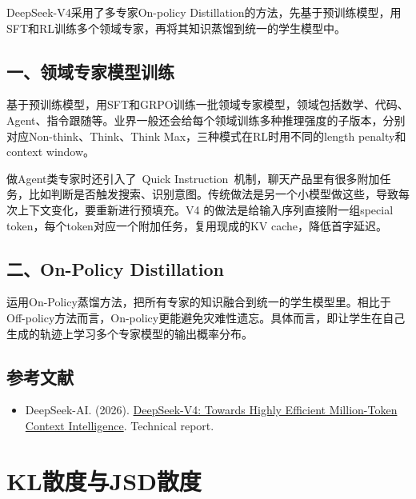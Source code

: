 DeepSeek-V4采用了多专家On-policy Distillation的方法，先基于预训练模型，用SFT和RL训练多个领域专家，再将其知识蒸馏到统一的学生模型中。

\hypertarget{ux4e00ux9886ux57dfux4e13ux5bb6ux6a21ux578bux8badux7ec3}{%
\subsection{一、领域专家模型训练}\label{ux4e00ux9886ux57dfux4e13ux5bb6ux6a21ux578bux8badux7ec3}}

基于预训练模型，用SFT和GRPO训练一批领域专家模型，领域包括数学、代码、Agent、指令跟随等。业界一般还会给每个领域训练多种推理强度的子版本，分别对应Non-think、Think、Think Max，三种模式在RL时用不同的length penalty和context window。

做Agent类专家时还引入了~Quick Instruction~机制，聊天产品里有很多附加任务，比如判断是否触发搜索、识别意图。传统做法是另一个小模型做这些，导致每次上下文变化，要重新进行预填充。V4 的做法是给输入序列直接附一组special token，每个token对应一个附加任务，复用现成的KV cache，降低首字延迟。

\hypertarget{ux4e8con-policy-distillation}{%
\subsection{二、On-Policy Distillation}\label{ux4e8con-policy-distillation}}

运用On-Policy蒸馏方法，把所有专家的知识融合到统一的学生模型里。相比于Off-policy方法而言，On-policy更能避免灾难性遗忘。具体而言，即让学生在自己生成的轨迹上学习多个专家模型的输出概率分布。

\hypertarget{ux53c2ux8003ux6587ux732e-104}{%
\subsection{参考文献}\label{ux53c2ux8003ux6587ux732e-104}}

\begin{itemize}
\tightlist
\item
  DeepSeek-AI. (2026). \href{https://huggingface.co/deepseek-ai/DeepSeek-V4-Pro/blob/main/DeepSeek_V4.pdf}{DeepSeek-V4: Towards Highly Efficient Million-Token Context Intelligence}. Technical report.
\end{itemize}

\clearpage

\hypertarget{klux6563ux5ea6ux4e0ejsdux6563ux5ea6}{%
\section{KL散度与JSD散度}\label{klux6563ux5ea6ux4e0ejsdux6563ux5ea6}}

